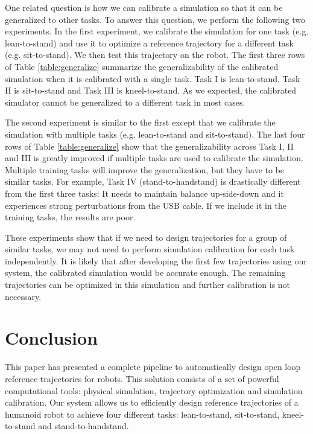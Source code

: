 
One related question is how we can calibrate a simulation so that it can be generalized to other tasks. To answer this question, we perform the following two experiments. In the first experiment, we calibrate the simulation for one task (e.g. lean-to-stand) and use it to optimize a reference trajectory for a different task (e.g. sit-to-stand). We then test this trajectory on the robot. The first three rows of Table \ref{table:generalize} summarize the generalizability of the calibrated simulation when it is calibrated with a single task. Task I is lean-to-stand. Task II is sit-to-stand and Task III is kneel-to-stand. As we expected, the calibrated simulator cannot be generalized to a different task in most cases.

The second experiment is similar to the first except that we calibrate the simulation with multiple tasks (e.g. lean-to-stand and sit-to-stand). The last four rows of Table \ref{table:generalize} show that the generalizability across Task I, II and III is greatly improved if multiple tasks are used to calibrate the simulation. Multiple training tasks will improve the generalization, but they have to be similar tasks. For example, Task IV (stand-to-handstand) is drastically different from the first three tasks: It needs to maintain balance up-side-down and it experiences strong perturbations from the USB cable. If we include it in the training tasks, the results are poor.

These experiments show that if we need to design trajectories for a group of similar tasks, we may not need to perform simulation calibration for each task independently. It is likely that after developing the first few trajectories using our system, the calibrated simulation would be accurate enough. The remaining trajectories can be optimized in this simulation and further calibration is not necessary.

\section{Conclusion}

This paper has presented a complete pipeline to automatically design open loop reference trajectories for robots. This solution consists of a set of powerful computational tools: physical simulation, trajectory optimization and simulation calibration. Our system allows us to efficiently design reference trajectories of a humanoid robot to achieve four different tasks: lean-to-stand, sit-to-stand, kneel-to-stand and stand-to-handstand.

